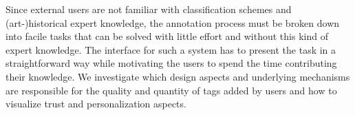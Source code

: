 Since external users are not familiar with classification schemes and \\ (art-)historical expert knowledge, the annotation process must be broken down into facile tasks that can be solved with little effort and without this kind of expert knowledge. %
The interface for such a system has to present the task in a straightforward way while motivating the users to spend the time contributing their knowledge. We investigate which design aspects and underlying mechanisms are responsible for the quality and quantity of tags added by users and how to visualize trust and personalization aspects.

